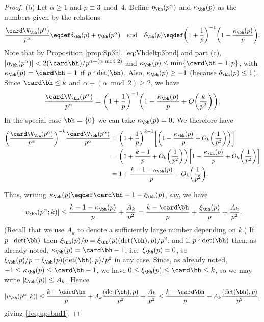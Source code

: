 \documentclass[12pt, reqno, twoside, letterpaper]{amsart}
\begin{document}
\begin{jetsam}
\begin{proof}
(b)
%
Let $\alpha \ge 1$ and $p \equiv 3 \bmod 4$.
%
Define $\eta_{\bh}(p^{\alpha})$ and $\kappa_{\bh}(p)$ as the 
numbers given by the relations
\[
 \frac{\card \V_{\bh}(p^{\alpha})}{p^{\alpha}}
  \eqdef 
   \delta_{\bh}(p) + \eta_{\bh}(p^{\alpha}) 
    \quad 
     \text{and}
      \quad 
 \delta_{\bh}(p) 
  \eqdef
   \bigg(1 + \frac{1}{p}\bigg)^{-1}
    \bigg(1 - \frac{\kappa_{\bh}(p)}{p}\bigg).
\]
%
Note that by Proposition \ref{prop:Sp3h}, \eqref{eq:Vhdeltp3bnd} 
and part (c),  
$
 |\eta_{\bh}(p^{\alpha})| 
  < 
   2(\card \bh)/p^{\alpha + (\alpha \bmod 2)}
$ and 
$\kappa_{\bh}(p) \le \min\{\card \bh - 1,p\}$, with 
$\kappa_{\bh}(p) = \card \bh - 1$ if $p \nmid \det(\bh)$.
%
Also, $\kappa_{\bh}(p) \ge -1$ (because $\delta_{\bh}(p) \le 1$).
%
Since $\card \bh \le k$ and $\alpha + (\alpha \bmod 2) \ge 2$, we 
have 
\[
 \frac{\card \V_{\bh}(p^{\alpha})}{p^{\alpha}}
  =
   \bigg(1 + \frac{1}{p}\bigg)^{-1}
    \bigg(1 - \frac{\kappa_{\bh}(p)}{p} + O\bigg(\frac{k}{p^2}\bigg)\bigg).
\]
%
In the special case $\bh = \{0\}$ we can take 
$\kappa_{\bh}(p) = 0$.
%
We therefore have  
\begin{align*}
 \bigg(\frac{\card \V_{\bz}(p^{\alpha})}{p^{\alpha}}\bigg)^{-k}
  \frac{\card \V_{\bh}(p^{\alpha})}{p^{\alpha}}
  &
   =
    \bigg(1 + \frac{1}{p}\bigg)^{k - 1}
     \bigg[
       \bigg(1 - \frac{\kappa_{\bh}(p)}{p} + O_k\bigg(\frac{1}{p^2}\bigg)\bigg)
     \bigg]
   \\
  &
   =
     \bigg(1 + \frac{k - 1}{p} +O_k\bigg(\frac{1}{p^2}\bigg)\bigg)
      \bigg[1 - \frac{\kappa_{\bh}(p)}{p} + O_k\bigg(\frac{1}{p^2}\bigg)\bigg]
 \\
   & 
    = 
      1 + \frac{k - 1 - \kappa_{\bh}(p)}{p} + O_k\bigg(\frac{1}{p^2}\bigg).
\end{align*}

\noindent 
Thus, writing 
$\kappa_{\bh}(p) \eqdef \card \bh - 1 - \xi_{\bh}(p)$, say, we have 
\[
 |\upsilon_{\bh}(p^{\alpha};k)|
  \le 
   \frac{k - 1 - \kappa_{\bh}(p)}{p} + \frac{A_k}{p^2}
    =
     \frac{k - \card \bh}{p} + \frac{\xi_{\bh}(p)}{p} + \frac{A_k}{p^2}.
\]
%
(Recall that we use $A_k$ to denote a sufficiently large number 
depending on $k$.)
%
If $p \mid \det(\bh)$ then 
$\xi_{\bh}(p)/p = \xi_{\bh}(p)(\det(\bh),p)/p^2$, and if 
$p \nmid \det(\bh)$ then, as already noted, 
$\kappa_{\bh}(p) = \card \bh - 1$, i.e.\ $\xi_{\bh}(p) = 0$, so 
$\xi_{\bh}(p)/p = \xi_{\bh}(p)(\det(\bh),p)/p^2$ in any case.
%
Since, as already noted, 
$-1 \le \kappa_{\bh}(p) \le \card \bh - 1$, 
we have $0 \le \xi_{\bh}(p) \le \card \bh \le k$, so we may write 
$|\xi_{\bh}(p)| \le A_k$.
%
Hence
\[
 |\upsilon_{\bh}(p^{\alpha};k)|
  \le 
   \frac{k - \card \bh}{p} + A_k\frac{(\det(\bh),p)}{p^2} + \frac{A_k}{p^2}
    \le
     \frac{k - \card \bh}{p} + A_k\frac{(\det(\bh),p)}{p^2},
\]
giving \eqref{Jeq:upsbnd1}.


\end{proof}
\end{jetsam}
\end{document}
